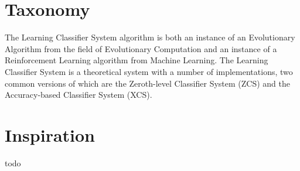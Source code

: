 \documentclass[a4paper, 11pt]{article}
\begin{document}
\section{Taxonomy}
\label{sec:taxonomy}
The Learning Classifier System algorithm is both an instance of an Evolutionary Algorithm from the field of Evolutionary Computation and an instance of a Reinforcement Learning algorithm from Machine Learning.
The Learning Classifier System is a theoretical system with a number of implementations, two common versions of which are the Zeroth-level Classifier System (ZCS) and the Accuracy-based Classifier System (XCS).

\section{Inspiration}
\label{sec:inspiration}
todo

\end{document}
